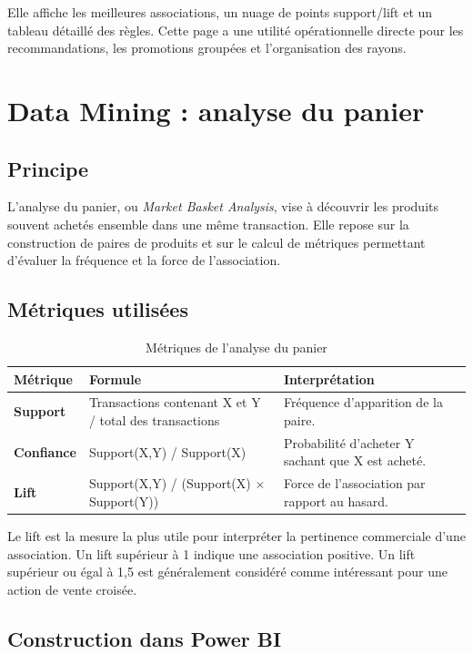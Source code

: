 \documentclass[12pt,a4paper,twoside]{report}
\begin{document}
Elle affiche les meilleures associations, un nuage de points support/lift et un tableau détaillé des règles. Cette page a une utilité opérationnelle directe pour les recommandations, les promotions groupées et l'organisation des rayons.

\chapter{Data Mining : analyse du panier}

\section{Principe}

L'analyse du panier, ou \textit{Market Basket Analysis}, vise à découvrir les produits souvent achetés ensemble dans une même transaction. Elle repose sur la construction de paires de produits et sur le calcul de métriques permettant d'évaluer la fréquence et la force de l'association.

\section{Métriques utilisées}

\begin{table}[H]
\centering
{}
\begin{tabularx}{\textwidth}{>{\bfseries}p{2.8cm}p{4.8cm}X}
\toprule
\rowcolor{TableHeader}
\color{white}Métrique & \color{white}Formule & \color{white}Interprétation \\
\midrule
Support & Transactions contenant X et Y / total des transactions & Fréquence d'apparition de la paire. \\
Confiance & Support(X,Y) / Support(X) & Probabilité d'acheter Y sachant que X est acheté. \\
Lift & Support(X,Y) / (Support(X) $\times$ Support(Y)) & Force de l'association par rapport au hasard. \\
\bottomrule
\end{tabularx}
\caption{Métriques de l'analyse du panier}
\end{table}

Le lift est la mesure la plus utile pour interpréter la pertinence commerciale d'une association. Un lift supérieur à 1 indique une association positive. Un lift supérieur ou égal à 1,5 est généralement considéré comme intéressant pour une action de vente croisée.

\section{Construction dans Power BI}
\end{document}
